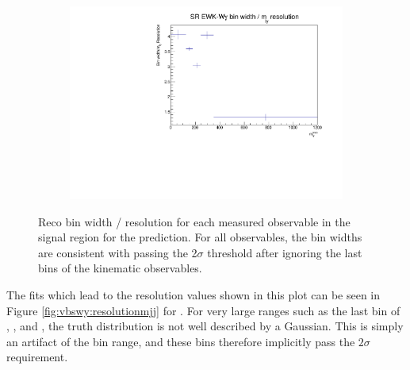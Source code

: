 \begin{figure}[t]
\begin{subfigure}[b]{0.48\textwidth}
    \caption{}
\end{subfigure}
\hfill
\begin{subfigure}[b]{0.48\textwidth}
    \centering
    \includegraphics[width=\textwidth]{plots/diffx/binning/ly_m_resolutions_rebin_SR.pdf}
    \caption{}
\end{subfigure}
\caption{Reco bin width / resolution for each measured observable in the signal region for the \ewwy prediction. For all observables, the bin widths are consistent with passing the 2$\sigma$ threshold after ignoring the last bins of the kinematic observables.}\label{fig:vbswy:resolutionsrebin}
\end{figure}

The fits which lead to the resolution values shown in this plot can be seen in Figure \ref{fig:vbswy:resolutionmjj} for \mjj. For very large ranges such as the last bin of \mjj, \leppt, and \mly, the truth distribution is not well described by a Gaussian. This is simply an artifact of the bin range, and these bins therefore implicitly pass the $2\sigma$ requirement.

